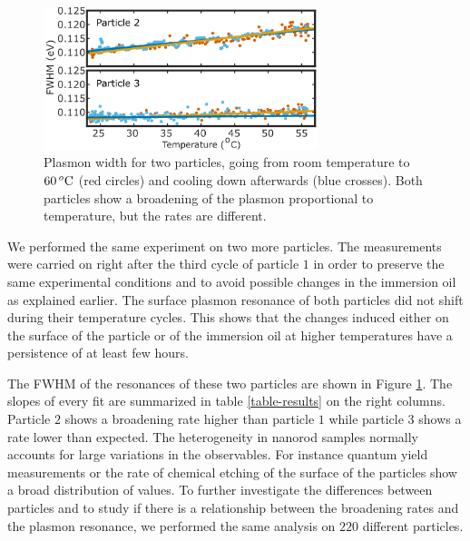 
\begin{figure}[tp] \centering 
\includegraphics[width=8cm]{Chapters/05_WhiteLight/Figures/03_Two_Pcles/03_Two_Pcles.png}
\caption{Plasmon width for two particles, 
going from room temperature to $60\,^o\textrm{C}$ (red circles) and cooling down
afterwards (blue crosses). Both particles show a broadening of the plasmon
proportional to temperature, but the rates are different.}	
\label{fig:two_pcles}
\end{figure}

We performed the same experiment on two more particles. The measurements were
carried on right after the third cycle of particle $1$ in order to preserve the
same experimental conditions and to avoid possible changes in the immersion oil
as explained earlier. The surface plasmon resonance of both particles did not
shift during their temperature cycles. This shows that the changes induced
either on the surface of the particle or of the immersion oil at higher
temperatures have a persistence of at least few hours.

The FWHM of the resonances of these two particles are shown in Figure
\ref{fig:two_pcles}. The slopes of every fit are summarized in table
\ref{table-results} on the right columns. Particle $2$ shows a broadening rate
higher than particle $1$ while particle $3$ shows a rate lower than expected.
The heterogeneity in nanorod samples normally accounts for large variations in
the observables. For instance quantum yield measurements\cite{Yorulmaz2012} or
the rate of chemical etching\cite{Carattino2016} of the surface of the particles
show a broad distribution of values. To further investigate the differences
between particles and to study if there is a relationship between the broadening
rates and the plasmon resonance, we performed the same analysis on $220$
different particles.

